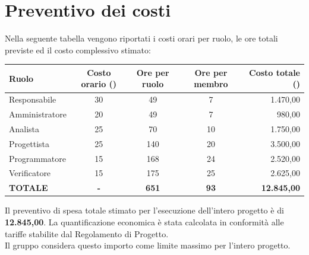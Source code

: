 \section{Preventivo dei costi}
Nella seguente tabella vengono riportati i costi orari per ruolo, le ore totali previste ed il costo complessivo stimato:

\vspace{2mm}
\noindent
\begin{tabularx}{\textwidth}{|X c c c r|}
\hline
\textbf{Ruolo} & \textbf{Costo orario (\texteuro{})} & \textbf{Ore per ruolo} & \textbf{Ore per membro} & \textbf{Costo totale (\texteuro{})} \\
\hline
Responsabile & 30 & 49 & 7 & 1.470,00 \\
Amministratore & 20 & 49 & 7 & 980,00 \\
Analista & 25 & 70 & 10 & 1.750,00 \\
Progettista & 25 & 140 & 20 & 3.500,00 \\
Programmatore & 15 & 168 & 24 & 2.520,00 \\
Verificatore & 15 & 175 & 25 & 2.625,00 \\
\hline
\textbf{TOTALE} & \textbf{-} & \textbf{651} & \textbf{93} & \textbf{12.845,00} \\
\hline
\end{tabularx}

\vspace{2mm}
Il preventivo di spesa totale stimato per l'esecuzione dell'intero progetto è di \textbf{\texteuro{} 12.845,00}. La quantificazione economica è stata calcolata in conformità alle tariffe stabilite dal Regolamento di Progetto. \\
Il gruppo considera questo importo come limite massimo per l'intero progetto.